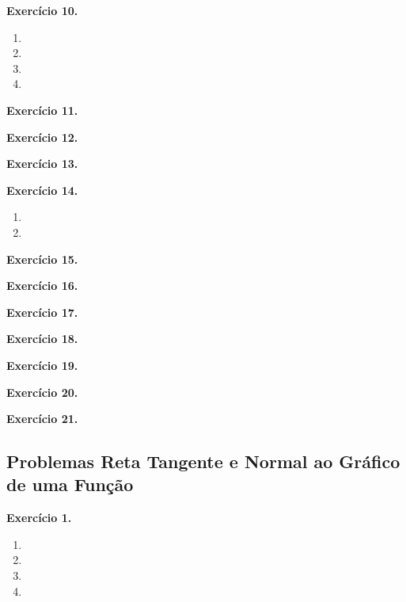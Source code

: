 \documentclass[12pt,a4paper]{article}
\begin{document}
\vspace{0.5cm}
\noindent\textbf{Exercício 10.}
\begin{enumerate}
    \renewcommand{\theenumi}{\alph{enumi}}
    \renewcommand{\labelenumi}{\theenumi)}
    \item 
    \item 
    \item 
    \item 
\end{enumerate}

\vspace{0.5cm}
\noindent\textbf{Exercício 11.}

\vspace{0.5cm}
\noindent\textbf{Exercício 12.}

\vspace{0.5cm}
\noindent\textbf{Exercício 13.}

\vspace{0.5cm}
\noindent\textbf{Exercício 14.}
\begin{enumerate}
    \renewcommand{\theenumi}{\alph{enumi}}
    \renewcommand{\labelenumi}{\theenumi)}
    \item 
    \item 
\end{enumerate}

\vspace{0.5cm}
\noindent\textbf{Exercício 15.}

\vspace{0.5cm}
\noindent\textbf{Exercício 16.}

\vspace{0.5cm}
\noindent\textbf{Exercício 17.}

\vspace{0.5cm}
\noindent\textbf{Exercício 18.}

\vspace{0.5cm}
\noindent\textbf{Exercício 19.}

\vspace{0.5cm}
\noindent\textbf{Exercício 20.}

\vspace{0.5cm}
\noindent\textbf{Exercício 21.}

\subsection{Problemas Reta Tangente e Normal ao Gráfico de uma Função}

\vspace{0.5cm}
\noindent\textbf{Exercício 1.}
\begin{enumerate}
    \renewcommand{\theenumi}{\alph{enumi}}
    \renewcommand{\labelenumi}{\theenumi)}
    \item 
    \item 
    \item 
    \item 
\end{enumerate}
\end{document}
